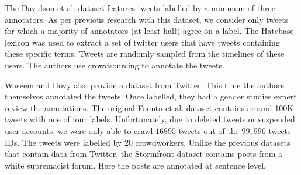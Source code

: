 \documentclass[a4paper,12pt]{report}
\begin{document}
The Davidson et al. dataset features tweets labelled by a minimum of three annotators. As per previous research with this dataset, we consider only tweets for which a majority of annotators (at least half) agree on a label. The Hatebase lexicon was used to extract a set of twitter users that have tweets containing these specific terms. Tweets are randomly sampled from the timelines of these users. The authors use crowdsourcing to annotate the tweets.

Waseem and Hovy also provide a dataset from Twitter. This time the authors themselves annotated the tweets. Once labelled, they had a gender studies expert review the annotations. The original Founta et al. dataset contains around 100K tweets with one of four labels. Unfortunately, due to deleted tweets or suspended user accounts, we were only able to crawl $16895$ tweets out of the $99,996$ tweets IDs. The tweets were labelled by 20 crowdworkers. Unlike the previous datasets that contain data from Twitter, the Stormfront dataset contains posts from a white supremacist forum. Here the posts are annotated at sentence level.
\end{document}

